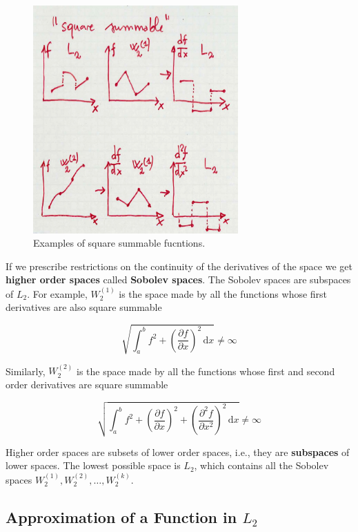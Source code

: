\documentclass{article}
\begin{document}
\begin{figure}[h!]
	\centering
		\includegraphics[width=0.7\textwidth]{./images/square_summable.jpg}
	\caption{Examples of square summable fucntions.}
	\label{fig:square_summable}
\end{figure}
    

    If we prescribe restrictions on the continuity of the derivatives of the
space we get \textbf{higher order spaces} called \textbf{Sobolev
spaces}. The Sobolev spaces are subspaces of \(L_2\). For example,
\(W^{(1)}_2\) is the space made by all the functions whose first
derivatives are also square summable

\[
\sqrt{\int^{b}_{a}{f^{2} + \left(\frac{\partial f}{\partial x}\right)^2}\, \mathrm{d}x} \neq \infty
\]

Similarly, \(W^{(2)}_2\) is the space made by all the functions whose
first and second order derivatives are square summable

\[
\sqrt{\int^{b}_{a}{f^{2} + \left(\frac{\partial f}{\partial x}\right)^2 + \left(\frac{\partial^2 f}{\partial x^2}\right)^2}\, \mathrm{d}x} \neq \infty
\]

Higher order spaces are subsets of lower order spaces, i.e., they are
\textbf{subspaces} of lower spaces. The lowest possible space is
\(L_2\), which contains all the Sobolev spaces
\(W^{(1)}_2,W^{(2)}_2,\ldots,W^{(k)}_2\).

\subsection{\texorpdfstring{Approximation of a Function in
\(L_2\)}{Approximation of a Function in L\_2}}\label{approximation-of-a-function-in-lux5f2}
\end{document}
